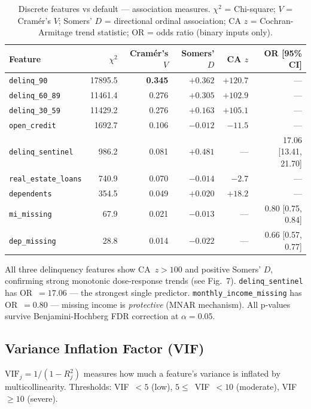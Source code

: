 \documentclass[11pt,a4paper]{article}
\begin{document}
\begin{table}[H]
\centering\footnotesize
\caption{Discrete features vs default --- association measures. $\chi^2$ = Chi-square; $V$ = Cram\'{e}r's $V$; Somers' $D$ = directional ordinal association; CA $z$ = Cochran-Armitage trend statistic; OR = odds ratio (binary inputs only).}
\begin{tabular}{@{}lrrrrr@{}}
\toprule
\textbf{Feature} & \textbf{$\chi^2$} & \textbf{Cram\'{e}r's $V$} & \textbf{Somers' $D$} & \textbf{CA $z$} & \textbf{OR [95\% CI]} \\
\midrule
\texttt{delinq\_90}        & 17895.5 & \textbf{0.345} & $+0.362$ & $+120.7$ & --- \\
\texttt{delinq\_60\_89}    & 11461.4 & 0.276 & $+0.305$ & $+102.9$ & --- \\
\texttt{delinq\_30\_59}    & 11429.2 & 0.276 & $+0.163$ & $+105.1$ & --- \\
\texttt{open\_credit}      &  1692.7 & 0.106 & $-0.012$ & $-11.5$  & --- \\
\texttt{delinq\_sentinel}  &   986.2 & 0.081 & $+0.481$ & ---      & 17.06 [13.41, 21.70] \\
\texttt{real\_estate\_loans} & 740.9 & 0.070 & $-0.014$ & $-2.7$   & --- \\
\texttt{dependents}        &   354.5 & 0.049 & $+0.020$ & $+18.2$  & --- \\
\texttt{mi\_missing}       &    67.9 & 0.021 & $-0.013$ & ---      & 0.80 [0.75, 0.84] \\
\texttt{dep\_missing}      &    28.8 & 0.014 & $-0.022$ & ---      & 0.66 [0.57, 0.77] \\
\bottomrule
\end{tabular}
\end{table}

All three delinquency features show CA~$z > 100$ and positive Somers' $D$, confirming strong monotonic dose-response trends (see Fig.~7).
\texttt{delinq\_sentinel} has OR~$= 17.06$ --- the strongest single predictor.
\texttt{monthly\_income\_missing} has OR~$= 0.80$ --- missing income is \emph{protective} (MNAR mechanism).
All p-values survive Benjamini-Hochberg FDR correction at $\alpha = 0.05$.

\subsection{Variance Inflation Factor (VIF)}

$\text{VIF}_j = 1/(1 - R_j^2)$ measures how much a feature's variance is inflated by multicollinearity. Thresholds: VIF~$< 5$ (low), $5 \leq$~VIF~$< 10$ (moderate), VIF~$\geq 10$ (severe).
\end{document}
